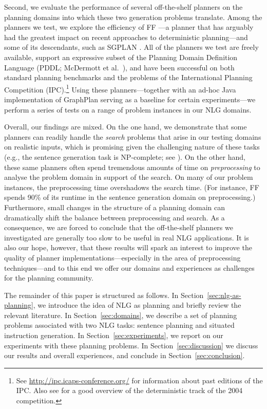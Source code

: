 Second, we evaluate the performance of several off-the-shelf planners
on the planning domains into which these two generation problems
translate. Among the planners we test, we explore the efficiency of FF
\citep{HoffmannNebel01}---a planner that has arguably had the greatest
impact on recent approaches to deterministic planning---and some of its
descendants, such as SGPLAN
\citep{hsu06:_new_featur_in_sgplan_for}. All of the planners we test
are freely available, support an expressive subset of the Planning
Domain Definition Language (PDDL; McDermott et al.~\citeyear{PDDL}),
and have been successful on both standard planning benchmarks and the
problems of the International Planning Competition (IPC).\footnote{See
  \url{http://ipc.icaps-conference.org/} for information about past
  editions of the IPC. Also see \citep{Hoffmann-Edelkamp:05} for a good
  overview of the deterministic track of the 2004 competition.}
Using these planners---together with an ad-hoc Java implementation of
GraphPlan \citep{Blum1997} serving as a baseline for certain
experiments---we perform a series of tests on a range of problem
instances in our NLG domains.

Overall, our findings are mixed. On the one hand, we demonstrate that
some planners can readily handle the \emph{search} problems that arise
in our testing domains on realistic inputs, which is promising given
the challenging nature of these tasks (e.g., the sentence generation
task is NP-complete; see \citealt{KolStr02}). On the other hand, these
same planners often spend tremendous amounts of time on
\emph{preprocessing} to analyse the problem domain in support of the
search. On many of our problem instances, the preprocessing time
overshadows the search time. (For instance, FF spends 90\% of its
runtime in the sentence generation domain on preprocessing.)
Furthermore, small changes in the structure of a planning domain can
dramatically shift the balance between preprocessing and search. As a
consequence, we are forced to conclude that the off-the-shelf planners
we investigated are generally too slow to be useful in real NLG
applications. It is also our hope, however, that these results will
spark an interest to improve the quality of planner
implementations---especially in the area of preprocessing
techniques---and to this end we offer our domains and experiences as
challenges for the planning community.

The remainder of this paper is structured as follows. In
Section~\ref{sec:nlg-as-planning}, we introduce the idea of NLG as
planning and briefly review the relevant literature. In
Section~\ref{sec:domains}, we describe a set of planning problems
associated with two NLG tasks: sentence planning and situated
instruction generation. In Section~\ref{sec:experiments}, we report on
our experiments with these planning problems.  In
Section~\ref{sec:discussion} we discuss our results and overall
experiences, and conclude in Section~\ref{sec:conclusion}.


